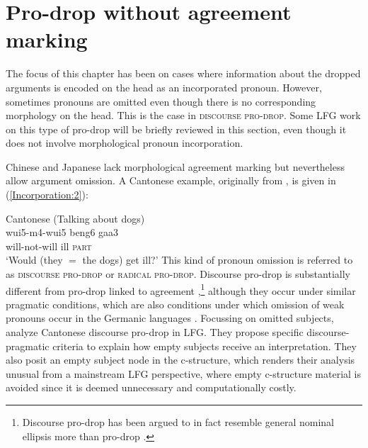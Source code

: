 \documentclass[output=paper,hidelinks]{langscibook}
\begin{document}
 


\section{Pro-drop without agreement marking}  \label{sec:othertypes}

 

The focus  of this chapter has been on cases where information about the dropped arguments is encoded on the head as an incorporated pronoun. However, sometimes pronouns are omitted even though there is no corresponding  morphology on the  head.  This is the case in \textsc{discourse pro-drop}.     Some LFG work on this type of pro-drop will be briefly reviewed in this section, even though it does not involve morphological pronoun incorporation. 

 Chinese and Japanese     lack morphological agreement marking but nevertheless  allow   argument omission.  A Cantonese   example, originally from  \citet{LukeBodomoNancarrow2001},   is  given in (\ref{Incorporation:2}):    

 
 \ea \label{Incorporation:2} Cantonese  (Talking about dogs) \\
 \gll  wui5-m4-wui5 beng6 gaa3 \\
   will-not-will ill \textsc{part}   \\
 \glt `Would (they $=$  the  dogs) get ill?'
\z
This  kind  of  pronoun omission is referred to as   \textsc{discourse pro-drop}  or \textsc{radical pro-drop}. Discourse pro-drop is substantially different from    pro-drop  linked to  agreement  \citep{NeelemanSzendroi07, sigurdsson2011, irgens2017},\footnote{Discourse pro-drop has  been argued to  in fact  resemble general  nominal ellipsis more than pro-drop \citep{irgens2017}.}  although they occur under similar  pragmatic conditions, which are also conditions under which omission of weak pronouns occur in the Germanic languages \citep[and references therein]{sigurdsson2011, rosen1998}. Focussing on  omitted subjects,  \citet{LukeBodomoNancarrow2001}    analyze   Cantonese discourse pro-drop  in LFG.  They propose specific discourse-pragmatic criteria to explain how empty subjects receive an interpretation.   They  also  posit an empty subject node in the c-structure, which renders their analysis unusual from a mainstream LFG perspective, where empty c-structure material is  avoided since it is   deemed unnecessary and computationally costly.
\end{document}

